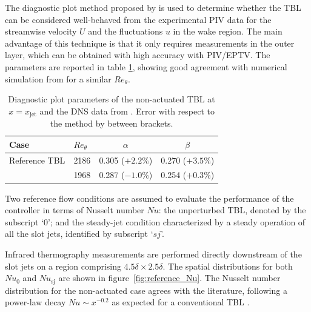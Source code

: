 The diagnostic plot method proposed by \citet{sanmiguel2017diagnostic} is used to determine whether the TBL can be considered well-behaved from the experimental PIV data for the streamwise velocity $U$ and the fluctuations $u$ in the wake region. The main advantage of this technique is that it only requires measurements in the outer layer, which can be obtained with high accuracy with PIV/EPTV. The parameters are reported in table \ref{tab:diagnostic}, showing good agreement with numerical simulation from \citet{jimenez2010} for a similar $Re_\theta$.

\begin{table} %
\centering
\begin{tabular}{llcc}
\toprule
Case & $Re_\theta$ & $\alpha$ & $\beta$ \\ \midrule
Reference TBL & 2186 & 0.305 ($+2.2\%$) & 0.270 ($+3.5\%$) \\
\citet{jimenez2010} & 1968 & 0.287 ($-1.0\%$) & 0.254 ($+0.3\%$) \\
\bottomrule
\end{tabular}
\caption{Diagnostic plot parameters of the non-actuated TBL at $x=x_\mathrm{jet}$ and the DNS data from \citet{jimenez2010}. Error with respect to the method by \citet{sanmiguel2017diagnostic} between brackets.}\label{tab:diagnostic}
\end{table}

Two reference flow conditions are assumed to evaluate the performance of the controller in terms of Nusselt number $Nu$: the unperturbed TBL, denoted by the subscript `$0$'; and the steady-jet condition characterized by a steady operation of all the slot jets, identified by subscript `$sj$'. 

Infrared thermography measurements are performed directly downstream of the slot jets on a region comprising $4.5\delta \times 2.5\delta$. The spatial distributions for both $Nu_\mathrm{0}$ and $Nu_\mathrm{sj}$ are shown in figure~\ref{fig:reference_Nu}. The Nusselt number distribution for the non-actuated case agrees with the literature, following a power-law decay $Nu \sim x^{-0.2}$ as expected for a conventional TBL \citep{Lienhard2020}. %

